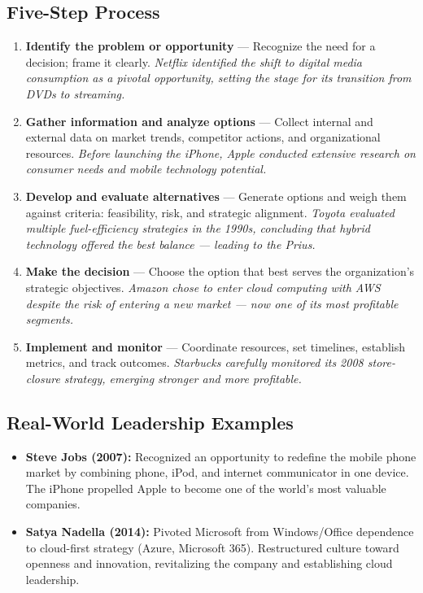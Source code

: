 \documentclass[11pt, letterpaper]{article}
\begin{document}
\subsection{Five-Step Process}

\begin{enumerate}[leftmargin=*, label=\textbf{Step \arabic*.}]
  \item \textbf{Identify the problem or opportunity} --- Recognize the need for a decision; frame it clearly. \textit{Netflix identified the shift to digital media consumption as a pivotal opportunity, setting the stage for its transition from DVDs to streaming.}
  \item \textbf{Gather information and analyze options} --- Collect internal and external data on market trends, competitor actions, and organizational resources. \textit{Before launching the iPhone, Apple conducted extensive research on consumer needs and mobile technology potential.}
  \item \textbf{Develop and evaluate alternatives} --- Generate options and weigh them against criteria: feasibility, risk, and strategic alignment. \textit{Toyota evaluated multiple fuel-efficiency strategies in the 1990s, concluding that hybrid technology offered the best balance --- leading to the Prius.}
  \item \textbf{Make the decision} --- Choose the option that best serves the organization's strategic objectives. \textit{Amazon chose to enter cloud computing with AWS despite the risk of entering a new market --- now one of its most profitable segments.}
  \item \textbf{Implement and monitor} --- Coordinate resources, set timelines, establish metrics, and track outcomes. \textit{Starbucks carefully monitored its 2008 store-closure strategy, emerging stronger and more profitable.}
\end{enumerate}

\subsection{Real-World Leadership Examples}

\begin{itemize}[leftmargin=*]
  \item \textbf{Steve Jobs (2007):} Recognized an opportunity to redefine the mobile phone market by combining phone, iPod, and internet communicator in one device. The iPhone propelled Apple to become one of the world's most valuable companies.
  \item \textbf{Satya Nadella (2014):} Pivoted Microsoft from Windows/Office dependence to cloud-first strategy (Azure, Microsoft 365). Restructured culture toward openness and innovation, revitalizing the company and establishing cloud leadership.
\end{itemize}
\end{document}
